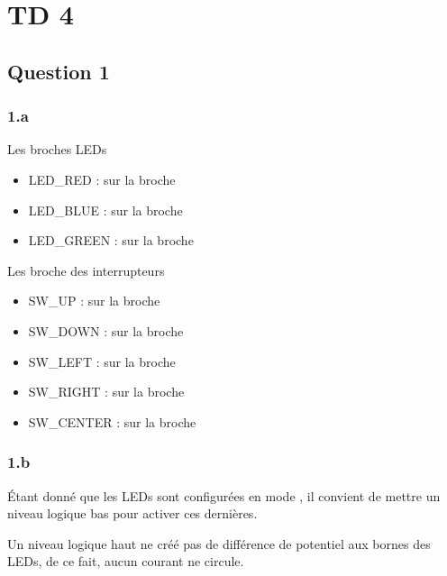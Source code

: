 \chapter{TD 4}
 \section{Question 1}

\subsection{1.a}

Les broches LEDs 

\begin{itemize}

  \item LED\_RED :  sur la broche 
  \item LED\_BLUE :  sur la broche 
  \item LED\_GREEN :  sur la broche 

\end{itemize}

Les broche des interrupteurs 

\begin{itemize}

  \item SW\_UP :  sur la broche 
  \item SW\_DOWN :  sur la broche 
  \item SW\_LEFT :  sur la broche 
  \item SW\_RIGHT :  sur la broche 
  \item SW\_CENTER :  sur la broche 

\end{itemize}

\subsection{1.b}

Étant donné que les LEDs sont configurées en mode , 
il convient de mettre un niveau logique bas pour activer ces dernières. \\


Un niveau logique haut ne créé pas de différence de potentiel aux bornes des LEDs, de ce fait, aucun courant ne circule.
  
